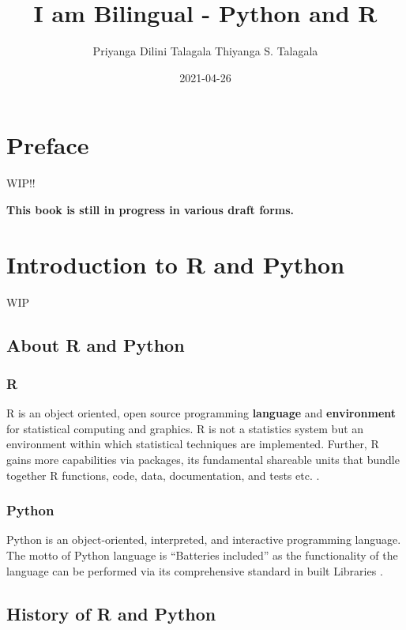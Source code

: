 \documentclass[]{book}
\title{I am Bilingual - Python and R}
\author{Priyanga Dilini Talagala Thiyanga S. Talagala}
\date{2021-04-26}
\begin{document}
\maketitle

{
\setcounter{tocdepth}{1}
\tableofcontents
}
\hypertarget{preface}{%
\chapter*{Preface}\label{preface}}

WIP!!

\textbf{This book is still in progress in various draft forms.}

\hypertarget{intro}{%
\chapter{Introduction to R and Python}\label{intro}}

WIP

\hypertarget{about-r-and-python}{%
\section{About R and Python}\label{about-r-and-python}}

\hypertarget{r}{%
\subsection{R}\label{r}}

R is an object oriented, open source programming \textbf{language} and \textbf{environment} for statistical computing and graphics. R is not a statistics system but an environment within which statistical techniques are implemented. Further, R gains more capabilities via packages, its fundamental shareable units that bundle together R functions, code, data, documentation, and tests etc. \citep{Rcoreteam2020}.

\hypertarget{python}{%
\subsection{Python}\label{python}}

Python is an object-oriented, interpreted, and interactive programming language. The motto of Python language is ``Batteries included'' as the functionality of the language can be performed via its comprehensive standard in built Libraries \citep{wikipython}.

\hypertarget{history-of-r-and-python}{%
\section{History of R and Python}\label{history-of-r-and-python}}
\end{document}
